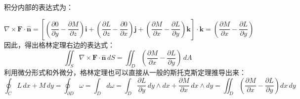 积分内部的表达式为：

$$
\nabla \times \mathbf{F} \cdot \mathbf{\hat{n}}
= 
\left[
\left(\frac{\partial 0}{\partial y} - \frac{\partial M}{\partial z}\right)\mathbf{i}
+ \left(\frac{\partial L}{\partial z} - \frac{\partial 0}{\partial x}\right)\mathbf{j}
+ \left(\frac{\partial M}{\partial x} - \frac{\partial L}{\partial y}\right)\mathbf{k}
\right]
\cdot \mathbf{k}
= 
\left(\frac{\partial M}{\partial x} - \frac{\partial L}{\partial y}\right)~
$$
因此，得出格林定理右边的表达式：
$$
\iint_S \nabla \times \mathbf{F} \cdot \mathbf{\hat{n}} \, dS
= 
\iint_D 
\left(\frac{\partial M}{\partial x} - \frac{\partial L}{\partial y}\right) 
\, dA~
$$
利用微分形式和外微分，格林定理也可以直接从一般的斯托克斯定理推导出来：
$$
\oint_C L\,dx + M\,dy
= \oint_{\partial D} \omega
= \int_D d\omega
= \int_D 
\frac{\partial L}{\partial y} \, dy \wedge dx
+ \frac{\partial M}{\partial x} \, dx \wedge dy
= 
\iint_D 
\left(\frac{\partial M}{\partial x} - \frac{\partial L}{\partial y}\right)
dx\,dy~
$$
